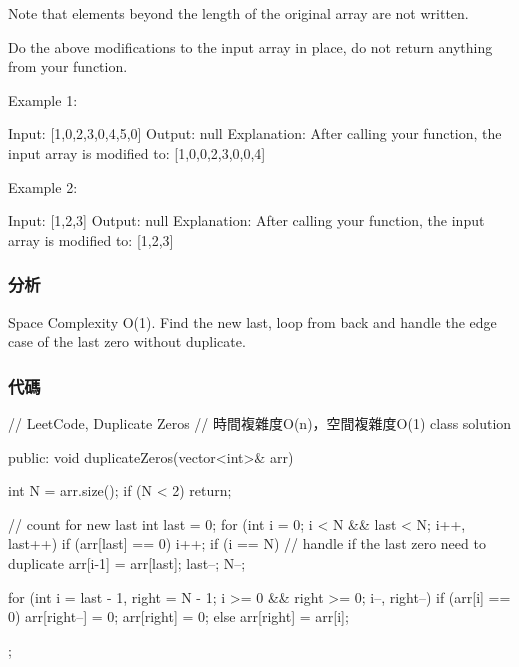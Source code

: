 Note that elements beyond the length of the original array are not written.

Do the above modifications to the input array in place, do not return anything from your function.

Example 1:
\begin{Code}
Input: [1,0,2,3,0,4,5,0]
Output: null
Explanation: After calling your function, the input array is modified to: [1,0,0,2,3,0,0,4]
\end{Code}

Example 2:
\begin{Code}
Input: [1,2,3]
Output: null
Explanation: After calling your function, the input array is modified to: [1,2,3]
\end{Code}

\subsubsection{分析}
Space Complexity O(1). Find the new last, loop from back and handle the edge case of the last zero without duplicate.

\subsubsection{代碼}
\begin{Code}
// LeetCode, Duplicate Zeros
// 時間複雜度O(n)，空間複雜度O(1)
class solution{
public:
    void duplicateZeros(vector<int>& arr) {
        int N = arr.size();
        if (N < 2) return;

        // count for new last
        int last = 0;
        for (int i = 0; i < N && last < N; i++, last++) {
            if (arr[last] == 0)
                i++;
            if (i == N) { // handle if the last zero need to duplicate
                arr[i-1] = arr[last];
                last--;
                N--;
            }
        }

        for (int i = last - 1, right = N - 1; i >= 0 && right >= 0; i--, right--) {
            if (arr[i] == 0) {
                arr[right--] = 0;
                arr[right] = 0;
            }
            else
                arr[right] = arr[i];
        }
    }
};
\end{Code}

